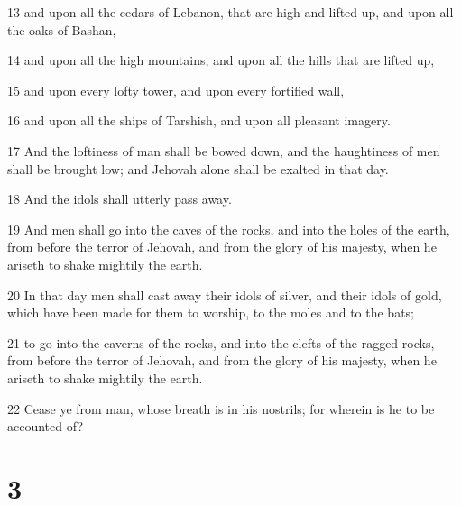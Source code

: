 \par 13 and upon all the cedars of Lebanon, that are high and lifted up, and upon all the oaks of Bashan,
\par 14 and upon all the high mountains, and upon all the hills that are lifted up,
\par 15 and upon every lofty tower, and upon every fortified wall,
\par 16 and upon all the ships of Tarshish, and upon all pleasant imagery.
\par 17 And the loftiness of man shall be bowed down, and the haughtiness of men shall be brought low; and Jehovah alone shall be exalted in that day.
\par 18 And the idols shall utterly pass away.
\par 19 And men shall go into the caves of the rocks, and into the holes of the earth, from before the terror of Jehovah, and from the glory of his majesty, when he ariseth to shake mightily the earth.
\par 20 In that day men shall cast away their idols of silver, and their idols of gold, which have been made for them to worship, to the moles and to the bats;
\par 21 to go into the caverns of the rocks, and into the clefts of the ragged rocks, from before the terror of Jehovah, and from the glory of his majesty, when he ariseth to shake mightily the earth.
\par 22 Cease ye from man, whose breath is in his nostrils; for wherein is he to be accounted of?

\chapter{3}

